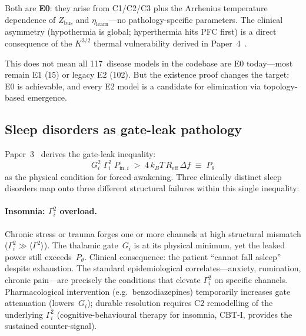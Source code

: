 \documentclass[aps,pre,twocolumn,superscriptaddress,floatfix]{revtex4-2}
\begin{document}
\noindent
Both are \textbf{E0}: they arise from C1/C2/C3 plus the
Arrhenius temperature dependence of $Z_{\mathrm{bus}}$
and $\eta_{\mathrm{learn}}$---no pathology-specific
parameters.  The clinical asymmetry (hypothermia is
global; hyperthermia hits PFC first) is a direct
consequence of the $K^{3/2}$ thermal vulnerability
derived in Paper~4~\cite{Paper4}.

This does not mean all 117~disease models in the codebase
are E0 today---most remain E1 (15) or legacy E2 (102).
But the existence proof changes the target:
E0 is achievable, and every E2 model is a candidate for
elimination via topology-based emergence.


\subsection{Sleep disorders as gate-leak pathology}
\label{sec:sleep-disorders}

Paper~3~\cite{Paper3} derives the gate-leak inequality:
\begin{equation}
  G_i^2\;\Gamma_i^2\;P_{\mathrm{in},i}
  \;>\;
  4\,k_B T\,R_{\mathrm{eff}}\,\Delta f
  \;\equiv\; P_\theta
  \tag{P3, Eq.\,10}
\end{equation}
as the physical condition for forced awakening.
Three clinically distinct sleep disorders map onto
three different structural failures within this
single inequality:

\paragraph{Insomnia: $\Gamma_i^2$ overload.}
Chronic stress or trauma forges one or more channels
at high structural mismatch ($\Gamma_i^2 \gg
\langle\Gamma^2\rangle$).
The thalamic gate~$G_i$ is at its physical minimum,
yet the leaked power still exceeds~$P_\theta$.
Clinical consequence: the patient ``cannot fall asleep''
despite exhaustion.
The standard epidemiological correlates---anxiety,
rumination, chronic pain---are precisely the conditions
that elevate $\Gamma_i^2$ on specific channels.
Pharmacological intervention (e.g.\ benzodiazepines)
temporarily increases gate attenuation (lowers~$G_i$);
durable resolution requires C2 remodelling of the
underlying $\Gamma_i^2$
(cognitive-behavioural therapy for insomnia, CBT-I,
provides the sustained counter-signal).
\end{document}

